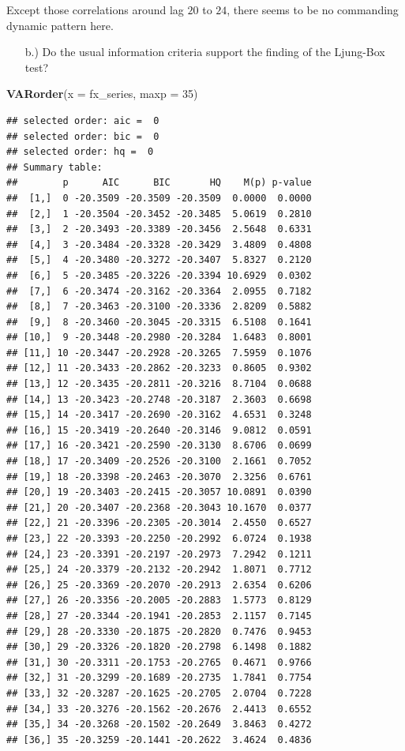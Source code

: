 \documentclass[12pt,a4paper]{article}
\newenvironment{Shaded}{\begin{snugshade}}{\end{snugshade}}
\newcommand{\DataTypeTok}[1]{\textcolor[rgb]{0.13,0.29,0.53}{#1}}
\newcommand{\DecValTok}[1]{\textcolor[rgb]{0.00,0.00,0.81}{#1}}
\newcommand{\KeywordTok}[1]{\textcolor[rgb]{0.13,0.29,0.53}{\textbf{#1}}}
\newcommand{\NormalTok}[1]{#1}
\begin{document}
Except those correlations around lag \(20\) to \(24\), there seems to be
no commanding dynamic pattern here.

\begin{itemize}
  \item[b.)] Do the usual information criteria support the finding of the Ljung-Box test? 
\end{itemize}

\begin{Shaded}
\begin{Highlighting}[]
\KeywordTok{VARorder}\NormalTok{(}\DataTypeTok{x =}\NormalTok{ fx_series, }\DataTypeTok{maxp =} \DecValTok{35}\NormalTok{)}
\end{Highlighting}
\end{Shaded}

\begin{verbatim}
## selected order: aic =  0 
## selected order: bic =  0 
## selected order: hq =  0 
## Summary table:  
##        p      AIC      BIC       HQ    M(p) p-value
##  [1,]  0 -20.3509 -20.3509 -20.3509  0.0000  0.0000
##  [2,]  1 -20.3504 -20.3452 -20.3485  5.0619  0.2810
##  [3,]  2 -20.3493 -20.3389 -20.3456  2.5648  0.6331
##  [4,]  3 -20.3484 -20.3328 -20.3429  3.4809  0.4808
##  [5,]  4 -20.3480 -20.3272 -20.3407  5.8327  0.2120
##  [6,]  5 -20.3485 -20.3226 -20.3394 10.6929  0.0302
##  [7,]  6 -20.3474 -20.3162 -20.3364  2.0955  0.7182
##  [8,]  7 -20.3463 -20.3100 -20.3336  2.8209  0.5882
##  [9,]  8 -20.3460 -20.3045 -20.3315  6.5108  0.1641
## [10,]  9 -20.3448 -20.2980 -20.3284  1.6483  0.8001
## [11,] 10 -20.3447 -20.2928 -20.3265  7.5959  0.1076
## [12,] 11 -20.3433 -20.2862 -20.3233  0.8605  0.9302
## [13,] 12 -20.3435 -20.2811 -20.3216  8.7104  0.0688
## [14,] 13 -20.3423 -20.2748 -20.3187  2.3603  0.6698
## [15,] 14 -20.3417 -20.2690 -20.3162  4.6531  0.3248
## [16,] 15 -20.3419 -20.2640 -20.3146  9.0812  0.0591
## [17,] 16 -20.3421 -20.2590 -20.3130  8.6706  0.0699
## [18,] 17 -20.3409 -20.2526 -20.3100  2.1661  0.7052
## [19,] 18 -20.3398 -20.2463 -20.3070  2.3256  0.6761
## [20,] 19 -20.3403 -20.2415 -20.3057 10.0891  0.0390
## [21,] 20 -20.3407 -20.2368 -20.3043 10.1670  0.0377
## [22,] 21 -20.3396 -20.2305 -20.3014  2.4550  0.6527
## [23,] 22 -20.3393 -20.2250 -20.2992  6.0724  0.1938
## [24,] 23 -20.3391 -20.2197 -20.2973  7.2942  0.1211
## [25,] 24 -20.3379 -20.2132 -20.2942  1.8071  0.7712
## [26,] 25 -20.3369 -20.2070 -20.2913  2.6354  0.6206
## [27,] 26 -20.3356 -20.2005 -20.2883  1.5773  0.8129
## [28,] 27 -20.3344 -20.1941 -20.2853  2.1157  0.7145
## [29,] 28 -20.3330 -20.1875 -20.2820  0.7476  0.9453
## [30,] 29 -20.3326 -20.1820 -20.2798  6.1498  0.1882
## [31,] 30 -20.3311 -20.1753 -20.2765  0.4671  0.9766
## [32,] 31 -20.3299 -20.1689 -20.2735  1.7841  0.7754
## [33,] 32 -20.3287 -20.1625 -20.2705  2.0704  0.7228
## [34,] 33 -20.3276 -20.1562 -20.2676  2.4413  0.6552
## [35,] 34 -20.3268 -20.1502 -20.2649  3.8463  0.4272
## [36,] 35 -20.3259 -20.1441 -20.2622  3.4624  0.4836
\end{verbatim}
\end{document}
